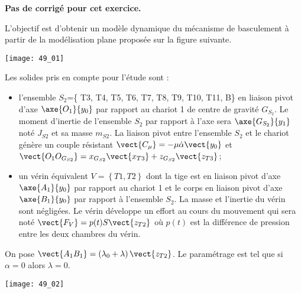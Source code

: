 \normalfalse \difficiletrue \tdifficilefalse
\correctionfalse



\setcounter{question}{0}
\ifcorrection
\else
\textbf{Pas de corrigé pour cet exercice.}
\fi

\ifprof
\else

L’objectif est d’obtenir un modèle dynamique du mécanisme de basculement à partir de la modélisation plane proposée sur la figure suivante.


\begin{center}
\texttt{[image: 49\_01]}
\end{center}

Les solides pris en compte pour l’étude sont :
\begin{itemize}
\item l'ensemble $S_2$=\{ T3, T4, T5, T6, T7, T8, T9, T10, T11, B\} en liaison pivot d'axe $\axe{O_1}{y_0}$ par rapport au chariot 1 de centre de gravité $G_{S_2}$. Le moment d’inertie de l’ensemble $S_2$ par rapport à l’axe sera $\axe{G_{S_2}}{y_1}$ noté $J_{S2}$ et sa masse $m_{S2}$. La liaison pivot entre l’ensemble $S_2$ et le chariot génère un couple résistant $\vect{C_{\mu}}=-\mu\dot{\alpha}\vect{y_0}$ et $\vect{O_1O_{G_{S2}}}=x_{G_{S2}} \vect{x_{T3}}+z_{G_{S2}} \vect{z_{T3}}$; 
\item un vérin équivalent $V=\left\{ T1,T2\right\}$ dont la tige est en liaison pivot d’axe $\axe{A_1}{y_0}$ par rapport au chariot 1 et le corps en liaison pivot d’axe $\axe{B_1}{y_0}$ par rapport à l’ensemble $S_2$. La masse et l’inertie du vérin sont négligées. Le vérin développe un effort au cours du mouvement qui sera noté $\vect{F_V} = p(t) S \vect{z_{T2}}$ où $p(t)$ est la différence de pression entre les deux chambres du vérin.
\end{itemize}


On pose $\vect{A_1B_1} = \left( \lambda_0+\lambda\right)\vect{z_{T2}}$. Le paramétrage est tel que si $\alpha=0$ alors $\lambda=0$.
\fi



\ifprof
\begin{center}
\texttt{[image: 49\_02]}
\end{center}

